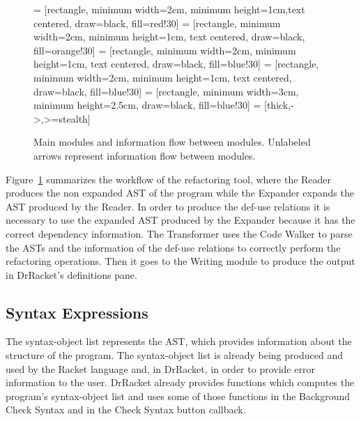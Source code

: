 \begin{figure}
\centering
{} = [rectangle,  minimum width=2cm, minimum height=1cm,text centered, draw=black, fill=red!30] %
 = [rectangle,  minimum width=2cm, minimum height=1cm, text centered, draw=black, fill=orange!30] %
 = [rectangle,  minimum width=2cm, minimum height=1cm, text centered, draw=black, fill=blue!30]
 = [rectangle,  minimum width=2cm, minimum height=1cm, text centered, draw=black, fill=blue!30]
 = [rectangle,  minimum width=3cm, minimum height=2.5cm, draw=black, fill=blue!30]
 = [thick,->,>=stealth]
\caption{Main modules and information flow between modules. Unlabeled arrows represent information
flow between modules.}
\label{flow-chart}
\end{figure}

Figure~\ref{flow-chart} summarizes the workflow of the refactoring
tool, where the Reader produces the non expanded AST of the program
while the Expander expands the AST produced by the Reader.  In order
to produce the def-use relations it is necessary to use the expanded
AST produced by the Expander because it has the correct dependency
information.  The Transformer uses the Code Walker to parse the ASTs
and the information of the def-use relations to correctly perform the
refactoring operations.  Then it goes to the Writing module to produce
the output in DrRacket's definitions pane.


\subsection{Syntax Expressions}
The syntax-object list represents the AST, which provides information
about the structure of the program.  The syntax-object list is already
being produced and used by the Racket language and, in DrRacket, in
order to provide error information to the user.  DrRacket already
provides functions which computes the program's syntax-object list and
uses some of those functions in the Background Check Syntax and in the
Check Syntax button callback.


